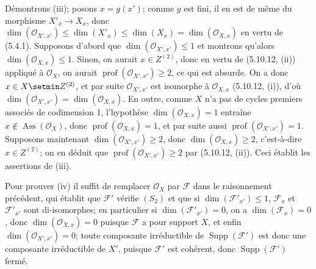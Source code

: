 Démontrons (iii); posons $x=g(x')$; comme $g$ est fini, il en est de même du
morphisme $X'_x\to X_x$, donc
$\dim(\mathcal O_{X',x'})\leq\dim(X'_x)\leq\dim(X_x)
=\dim(\mathcal O_{X,x})$
en vertu de (5.4.1). Supposons d'abord que
$\dim(\mathcal O_{X',x'})\leq1$ et montrons qu'alors
$\dim(\mathcal O_{X,x})\leq1$. Sinon, on aurait $x\in Z^{(2)}$, donc en vertu
de (5.10.12, (ii)) appliqué à $\mathcal O_X$, on aurait
$\operatorname{prof}(\mathcal O_{X',x'})\geq2$, ce qui est absurde. On a donc
$x\in X\setmin Z^{(2)}$, et par suite $\mathcal O_{X',x'}$ est isomorphe à
$\mathcal O_{X,x}$ (5.10.12, (i)), d'où
$\dim(\mathcal O_{X',x'})=\dim(\mathcal O_{X,x})$. En outre, comme $X$ n'a
pas de cycles
premiers associés de codimension 1, l'hypothèse
$\dim(\mathcal O_{X,x})=1$ entraîne $x\notin\operatorname{Ass}(\mathcal O_X)$,
donc $\operatorname{prof}(\mathcal O_{X,x})=1$, et par suite aussi
$\operatorname{prof}(\mathcal O_{X',x'})=1$. Supposons maintenant
$\dim(\mathcal O_{X',x'})\geq2$, donc $\dim(\mathcal O_{X,x})\geq2$,
c'est-à-dire $x\in Z^{(2)}$; on en déduit que
$\operatorname{prof}(\mathcal O_{X',x'})\geq2$ par (5.10.12, (ii)). Ceci
établit les assertions de (iii).

Pour prouver (iv) il suffit de remplacer $\mathcal O_X$ par $\mathcal F$ dans
le raisonnement précédent, qui établit que $\mathcal F'$ vérifie $(S_2)$ et
que si $\dim(\mathcal F'_{x'})\leq1$, $\mathcal F_x$ et
$\mathcal F'_{x'}$ sont di-isomorphes; en particulier si
$\dim(\mathcal F'_{x'})=0$, on a $\dim(\mathcal F_x)=0$, donc
$\dim(\mathcal O_{X,x})=0$ puisque $\mathcal F$ a pour support $X$, et enfin
$\dim(\mathcal O_{X',x'})=0$; toute composante irréductible de
$\operatorname{Supp}(\mathcal F')$ est donc une composante irréductible de
$X'$, puisque $\mathcal F'$ est cohérent, donc
$\operatorname{Supp}(\mathcal F')$ fermé.

